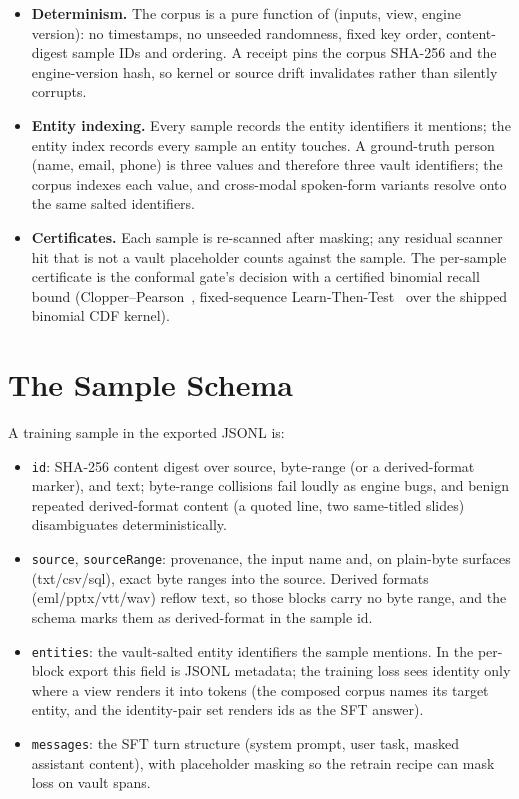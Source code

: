 \documentclass{article}
\begin{document}
\begin{itemize}
  \item \textbf{Determinism.} The corpus is a pure function of (inputs, view, engine version): no timestamps, no unseeded randomness, fixed key order, content-digest sample IDs and ordering. A receipt pins the corpus SHA-256 and the engine-version hash, so kernel or source drift invalidates rather than silently corrupts.
  \item \textbf{Entity indexing.} Every sample records the entity identifiers it mentions; the entity index records every sample an entity touches. A ground-truth person (name, email, phone) is three values and therefore three vault identifiers; the corpus indexes each value, and cross-modal spoken-form variants resolve onto the same salted identifiers.
  \item \textbf{Certificates.} Each sample is re-scanned after masking; any residual scanner hit that is not a vault placeholder counts against the sample. The per-sample certificate is the conformal gate's decision with a certified binomial recall bound (Clopper--Pearson~\cite{clopper1934binomial}, fixed-sequence Learn-Then-Test~\cite{angelopoulos2021ltt} over the shipped binomial CDF kernel).
\end{itemize}

\section{The Sample Schema}
\label{sec:schema}

A training sample in the exported JSONL is:

\begin{itemize}
  \item \texttt{id}: SHA-256 content digest over source, byte-range (or a derived-format marker), and text; byte-range collisions fail loudly as engine bugs, and benign repeated derived-format content (a quoted line, two same-titled slides) disambiguates deterministically.
  \item \texttt{source}, \texttt{sourceRange}: provenance, the input name and, on plain-byte surfaces (txt/csv/sql), exact byte ranges into the source. Derived formats (eml/pptx/vtt/wav) reflow text, so those blocks carry no byte range, and the schema marks them as derived-format in the sample id.
  \item \texttt{entities}: the vault-salted entity identifiers the sample mentions. In the per-block export this field is JSONL metadata; the training loss sees identity only where a view renders it into tokens (the composed corpus names its target entity, and the identity-pair set renders ids as the SFT answer).
  \item \texttt{messages}: the SFT turn structure (system prompt, user task, masked assistant content), with placeholder masking so the retrain recipe can mask loss on vault spans.
\end{itemize}
\end{document}
